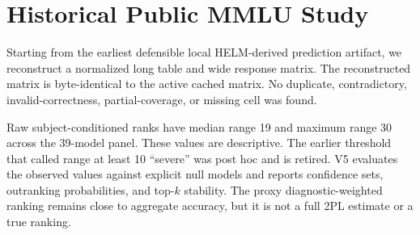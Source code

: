 \section{Historical Public MMLU Study}

Starting from the earliest defensible local HELM-derived prediction artifact, we reconstruct a
normalized long table and wide response matrix. The reconstructed matrix is byte-identical to the
active cached matrix. No duplicate, contradictory, invalid-correctness, partial-coverage, or missing
cell was found.



Raw subject-conditioned ranks have median range 19 and maximum range 30 across the 39-model panel.
These values are descriptive. The earlier threshold that called range at least 10 ``severe'' was
post hoc and is retired. V5 evaluates the observed values against explicit null models and reports
confidence sets, outranking probabilities, and top-$k$ stability. The proxy diagnostic-weighted
ranking remains close to aggregate accuracy, but it is not a full 2PL estimate or a true ranking.
